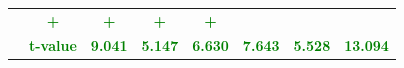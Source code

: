 \documentclass[11pt,english,a4paper,hidelinks]{book}
\begin{document}
\begin{table}[H]
\begin{tabular}{lccccccc}
                     & \textbf{\textcolor{green}{+}}
                     & \textbf{\textcolor{green}{+}}
                     & \textbf{\textcolor{green}{+}}
                     & \textbf{\textcolor{green}{+}} \\
            & \textbf{\textcolor{green}{t-value}}
                     & \textbf{\textcolor{green}{9.041}}
                     & \textbf{\textcolor{green}{5.147}}
                     & \textbf{\textcolor{green}{6.630}}
                     & \textbf{\textcolor{green}{7.643}}
                     & \textbf{\textcolor{green}{5.528}}
                     & \textbf{\textcolor{green}{13.094}} \\
        \bottomrule
    \end{tabular}
    \label{tab:africa_middle_east_quality_consistency}
\end{table}
\end{document}
